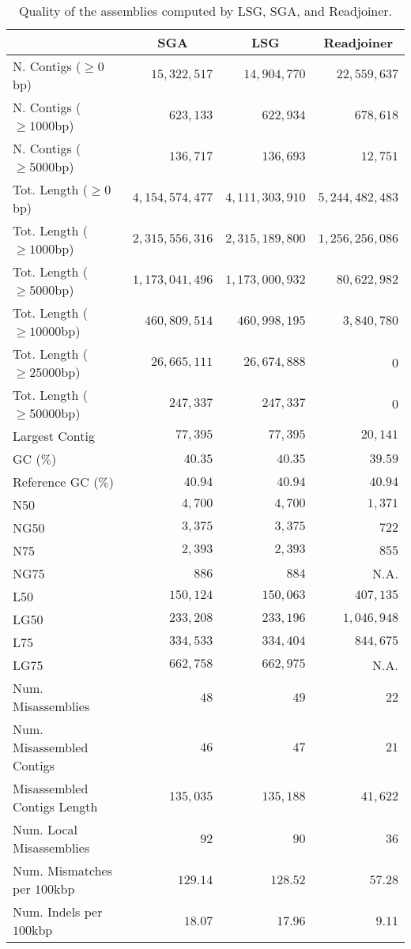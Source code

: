 \documentclass[11pt,oneside,a4paper]{article}
\newcommand{\otoprule}{\midrule[\heavyrulewidth]}
\begin{document}
\begin{table}[ht!]
\caption{Quality of the assemblies computed by LSG,
SGA, and Readjoiner.}
\begin{center}
\begin{tabular}{l|r|r|r}
\toprule
& \multicolumn{1}{c|}{SGA} & \multicolumn{1}{c|}{LSG} &
\multicolumn{1}{c}{Readjoiner} \\
\otoprule
N. Contigs ($\ge 0$bp) & $15,322,517$ & $14,904,770$ & $22,559,637$ \\
N. Contigs ($\ge 1000$bp) & $623,133$ & $622,934$ & $678,618$ \\
N. Contigs ($\ge 5000$bp) & $136,717$ & $136,693$ & $12,751$ \\
\midrule
Tot. Length ($\ge 0$bp) & $4,154,574,477$ & $4,111,303,910$ & $5,244,482,483$ \\
Tot. Length ($\ge 1000$bp) & $2,315,556,316$ & $2,315,189,800$ & $1,256,256,086$ \\
Tot. Length ($\ge 5000$bp) & $1,173,041,496$ & $1,173,000,932$ & $80,622,982$ \\
Tot. Length ($\ge 10000$bp) & $460,809,514$ & $460,998,195$ & $3,840,780$ \\
Tot. Length ($\ge 25000$bp) & $26,665,111$ & $26,674,888$ & $0$ \\
Tot. Length ($\ge 50000$bp) & $247,337$ & $247,337$ & $0$ \\
\midrule
Largest Contig & $77,395$ & $77,395$ & $20,141$ \\
GC ($\%$) & $40.35$ & $40.35$ & $39.59$ \\
Reference GC ($\%$) & $40.94$ & $40.94$ & $40.94$ \\
\midrule
N50 & $4,700$ & $4,700$ & $1,371$ \\
NG50 & $3,375$ & $3,375$ & $722$ \\
N75 & $2,393$ & $2,393$ & $855$ \\
NG75 & $886$ & $884$ & N.A. \\
L50 & $150,124$ & $150,063$ & $407,135$ \\
LG50 & $233,208$ & $233,196$ & $1,046,948$ \\
L75 & $334,533$ & $334,404$ & $844,675$ \\
LG75 & $662,758$ & $662,975$ & N.A. \\
\midrule
Num. Misassemblies & $48$ & $49$ & $22$ \\
Num. Misassembled Contigs & $46$ & $47$ & $21$ \\
Misassembled Contigs Length & $135,035$ & $135,188$ & $41,622$ \\
Num. Local Misassemblies & $92$ & $90$ & $36$ \\
Num. Mismatches per $100$kbp & $129.14$ & $128.52$ & $57.28$ \\
Num. Indels per $100$kbp & $18.07$ & $17.96$ & $9.11$ \\
\bottomrule
\end{tabular}
\end{center}
\label{table:full-dataset-total-quality}
\end{table}
\end{document}
